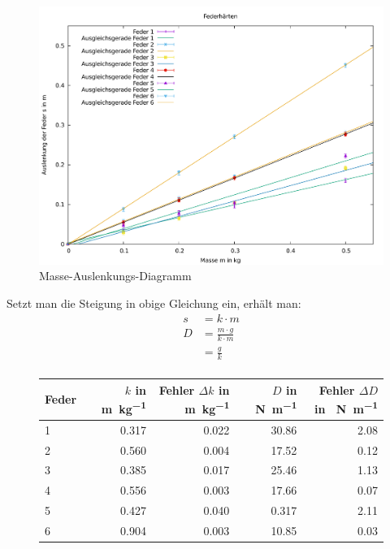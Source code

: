 \begin{figure}[H]
\includegraphics[width=\textwidth]{data/hardness.pdf}
\caption{Masse-Auslenkungs-Diagramm}
\end{figure}

Setzt man die Steigung in obige Gleichung ein, erhält man:
\begin{align*}
s &= k \cdot m \\
D &= \frac{m \cdot g}{k \cdot m} \\
  &= \frac{g}{k} \\
\end{align*}

\begin{figure}[H]
\centering
\begin{tabular}{lrrrr}
Feder & $k$ in \SI{}{\meter\per\kilo\gram} & Fehler $\Delta k$ in \SI{}{\meter\per\kilo\gram} & $D$ in \SI{}{\newton\per\meter} & Fehler $\Delta D$ in \SI{}{\newton\per\meter} \\ \hline
1 & \num{0.317} & \num{0.022} & \num{30.86} & \num{2.08}\\
2 & \num{0.560} & \num{0.004} & \num{17.52} & \num{0.12}\\
3 & \num{0.385} & \num{0.017} & \num{25.46} & \num{1.13}\\
4 & \num{0.556} & \num{0.003} & \num{17.66} & \num{0.07}\\
5 & \num{0.427} & \num{0.040} & \num{0.317} & \num{2.11}\\
6 & \num{0.904} & \num{0.003} & \num{10.85} & \num{0.03}\\
\end{tabular}
\end{figure}

